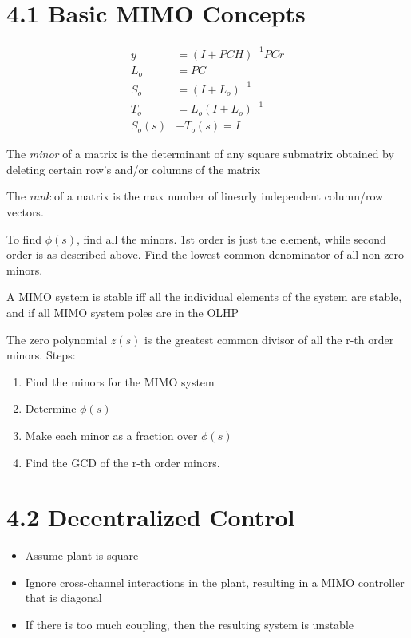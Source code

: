 \section*{4.1 Basic MIMO Concepts}
\begin{equation*}
    \begin{aligned}
        y      & = ( I + PCH )^{-1} PCr \\
        L_o    & = PC                   \\
        S_o    & = (I + L_o) ^ {-1}     \\
        T_o    & = L_o(I + L_o) ^ {-1}  \\
        S_o(s) & + T_o(s) = I
    \end{aligned}
\end{equation*}

The \textit{minor} of a matrix is the determinant of any square submatrix obtained by deleting certain row's and/or columns of the matrix

The \textit{rank} of a matrix is the max number of linearly independent column/row vectors.

To find \(\phi(s)\), find all the minors. 1st order is just the element, while second order is as described above. Find the lowest common denominator of all non-zero minors.

A MIMO system is stable iff all the individual elements of the system are stable, and if all MIMO system poles are in the OLHP

The zero polynomial \(z(s)\) is the greatest common divisor of all the r-th order minors. Steps:
\begin{enumerate}
    \item Find the minors for the MIMO system
    \item Determine \(\phi(s)\)
    \item Make each minor as a fraction over \(\phi(s)\)
    \item Find the GCD of the r-th order minors.
\end{enumerate}

\section*{4.2 Decentralized Control}
\begin{itemize}
    \item Assume plant is square
    \item Ignore cross-channel interactions in the plant, resulting in a MIMO controller that is diagonal
    \item If there is too much coupling, then the resulting system is unstable
\end{itemize}
